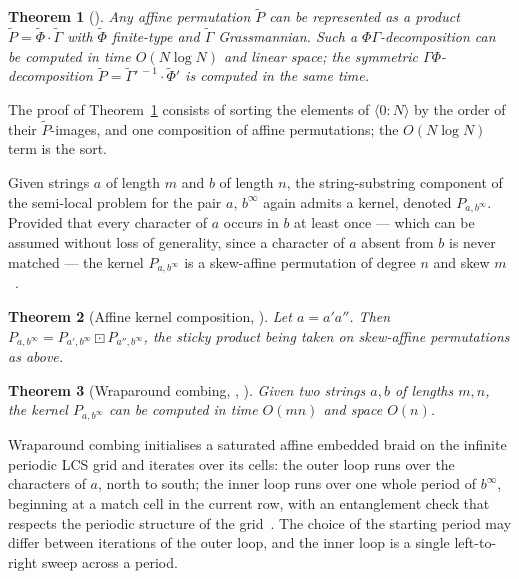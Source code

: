 \documentclass[10pt]{article}
\newtheorem{theorem}{Theorem}
\newcommand{\stick}{\boxdot}
\begin{document}
\begin{theorem}[{\cite[Proposition 29]{GZT25}}]\label{thm:decomp}
Any affine permutation $\tilde P$ can be represented as a product
$\tilde P=\tilde\Phi\cdot\tilde\Gamma$ with $\tilde\Phi$ finite-type and
$\tilde\Gamma$ Grassmannian. Such a \emph{$\Phi\Gamma$-decomposition} can be
computed in time $O(N\log N)$ and linear space; the symmetric
\emph{$\Gamma\Phi$-decomposition}
$\tilde P=\tilde\Gamma'^{\,-1}\cdot\tilde\Phi'$ is computed in the same time.
\end{theorem}

The proof of Theorem~\ref{thm:decomp} consists of sorting the elements of
$\langle 0:N\rangle$ by the order of their $\tilde P$-images, and one
composition of affine permutations; the $O(N\log N)$ term is the sort.

Given strings $a$ of length $m$ and $b$ of length $n$, the string-substring
component of the semi-local problem for the pair $a$, $b^\infty$ again admits
a kernel, denoted $P_{a,b^\infty}$. Provided that every character of $a$
occurs in $b$ at least once --- which can be assumed without loss of
generality, since a character of $a$ absent from $b$ is never matched --- the
kernel $P_{a,b^\infty}$ is a skew-affine permutation of degree $n$ and skew
$m$~\cite[Section 3.3]{GZT25}.

\begin{theorem}[Affine kernel composition,
{\cite[Theorem 40]{GZT25}}]\label{thm:affinecompose}
Let $a=a'a''$. Then
$P_{a,b^\infty}=P_{a',b^\infty}\stick P_{a'',b^\infty}$, the sticky product
being taken on skew-affine permutations as above.
\end{theorem}

\begin{theorem}[Wraparound combing, \cite{Tiskin09},
{\cite[Section 3.3]{GZT25}}]\label{thm:combing}
Given two strings $a,b$ of lengths $m,n$, the kernel $P_{a,b^\infty}$ can be
computed in time $O(mn)$ and space $O(n)$.
\end{theorem}

Wraparound combing initialises a saturated affine embedded braid on the
infinite periodic LCS grid and iterates over its cells: the outer loop runs
over the characters of $a$, north to south; the inner loop runs over one whole
period of $b^\infty$, beginning at a match cell in the current row, with an
entanglement check that respects the periodic structure of the
grid~\cite[Section 3.3]{GZT25}. The choice of the starting period may differ
between iterations of the outer loop, and the inner loop is a single
left-to-right sweep across a period.
\end{document}
